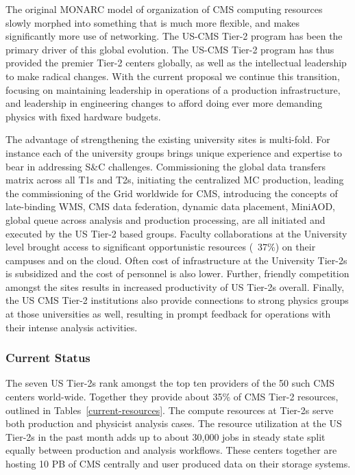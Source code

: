 \documentclass[11pt,a4paper]{article}
\begin{document}
The original MONARC model of organization of CMS computing resources
slowly morphed into something that is much more flexible, and makes significantly more use 
of networking.  The US-CMS Tier-2 program has been the primary driver of this global evolution.
The US-CMS Tier-2 program has thus provided the premier Tier-2 centers globally,
as well as the intellectual leadership to make radical changes. With the current proposal
we continue this transition, focusing on maintaining leadership in operations of a
production infrastructure, and leadership in engineering changes to afford
doing ever more demanding physics with fixed hardware budgets.

The advantage of strengthening the existing university sites is multi-fold.
For instance each of the university groups brings unique experience and 
expertise to bear in addressing S\&C challenges.  Commissioning the global 
data transfers matrix across all T1s and T2s, initiating the centralized MC production, 
leading the commissioning of the Grid worldwide for CMS, introducing the 
concepts of late-binding WMS, CMS data federation, dynamic data placement, 
MiniAOD, global queue across analysis and production processing, are all
initiated and executed by the US Tier-2 based groups.  Faculty collaborations 
at the University level brought access to significant opportunistic resources 
(~37\%) on their campuses and on the cloud.  Often cost of infrastructure 
at the University Tier-2s is subsidized and the cost of personnel is also lower.
Further, friendly competition amongst the sites results in increased productivity
of US Tier-2s overall.  Finally, the US CMS Tier-2 institutions also provide 
connections to strong physics groups at those universities as well, resulting 
in prompt feedback for operations with their intense analysis activities.  

\subsubsection{Current Status}

The seven US Tier-2s rank amongst the top ten providers of the 50 such 
CMS centers world-wide. Together they provide about 35\% of CMS
Tier-2 resources, outlined in Tables~\ref{current-resources}.
The compute resources at Tier-2s serve both production and physicist analysis cases.  
The resource utilization at the US Tier-2s in the past month adds up to about 30,000 jobs 
in steady state split equally between production and analysis workflows. 
These centers together are hosting 10 PB of CMS centrally and
user produced data on their storage systems.
\end{document}
